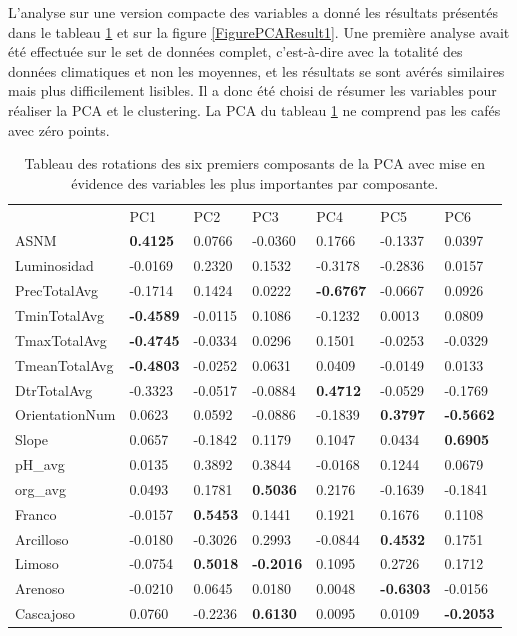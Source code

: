 L'analyse sur une version compacte des variables a donné les résultats présentés dans le tableau \ref{TablePCAResult1} et sur la figure \ref{FigurePCAResult1}. Une première analyse avait été effectuée sur le set de données complet, c'est-à-dire avec la totalité des données climatiques et non les moyennes, et les résultats se sont avérés similaires mais plus difficilement lisibles. Il a donc été choisi de résumer les variables pour réaliser la PCA et le clustering. La PCA du tableau \ref{TablePCAResult1} ne comprend pas les cafés avec zéro points.
\begin{table}[]
	\centering
	\begin{tabular}{lllllll}
		& PC1     & PC2     & PC3     & PC4     & PC5     & PC6     \\
		ASNM           & \textbf{0.4125}  & 0.0766  & -0.0360 & 0.1766  & -0.1337 & 0.0397  \\
		Luminosidad    & -0.0169 & 0.2320  & 0.1532  & -0.3178 & -0.2836 & 0.0157  \\
		PrecTotalAvg   & -0.1714 & 0.1424  & 0.0222  & \textbf{-0.6767} & -0.0667 & 0.0926  \\
		TminTotalAvg   & \textbf{-0.4589} & -0.0115 & 0.1086  & -0.1232 & 0.0013  & 0.0809  \\
		TmaxTotalAvg   & \textbf{-0.4745} & -0.0334 & 0.0296  & 0.1501  & -0.0253 & -0.0329 \\
		TmeanTotalAvg  & \textbf{-0.4803} & -0.0252 & 0.0631  & 0.0409  & -0.0149 & 0.0133  \\
		DtrTotalAvg    & -0.3323 & -0.0517 & -0.0884 & \textbf{0.4712}  & -0.0529 & -0.1769 \\
		OrientationNum & 0.0623  & 0.0592  & -0.0886 & -0.1839 & \textbf{0.3797}  & \textbf{-0.5662} \\
		Slope          & 0.0657  & -0.1842 & 0.1179  & 0.1047  & 0.0434  & \textbf{0.6905}  \\
		pH\_avg        & 0.0135  & 0.3892  & 0.3844  & -0.0168 & 0.1244  & 0.0679  \\
		org\_avg       & 0.0493  & 0.1781  & \textbf{0.5036}  & 0.2176  & -0.1639 & -0.1841 \\
		Franco         & -0.0157 & \textbf{0.5453}  & 0.1441  & 0.1921  & 0.1676  & 0.1108  \\
		Arcilloso      & -0.0180 & -0.3026 & 0.2993  & -0.0844 & \textbf{0.4532}  & 0.1751  \\
		Limoso         & -0.0754 & \textbf{0.5018}  & \textbf{-0.2016} & 0.1095  & 0.2726  & 0.1712  \\
		Arenoso        & -0.0210 & 0.0645  & 0.0180  & 0.0048  & \textbf{-0.6303} & -0.0156 \\
		Cascajoso      & 0.0760  & -0.2236 & \textbf{0.6130}  & 0.0095  & 0.0109  & \textbf{-0.2053}
	\end{tabular}
	\caption{\label{TablePCAResult1}Tableau des rotations des six premiers composants de la PCA avec mise en évidence des variables les plus importantes par composante.}
\end{table}


